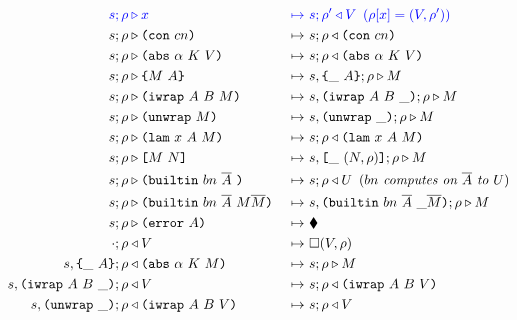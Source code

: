 \documentclass[../plutus-core-specification.tex]{subfiles}
\begin{document}
\begin{figure}[!ht]
  \ContinuedFloat
\begin{subfigure}[c]{\linewidth}  %
    \begin{alignat*}{2}
      \blue{s; \rho} & \bcompute \blue{x}          &~\bmapsto~&\blue{s;\rho^{\prime} \return V \enspace (\rho[x] = (V,\rho^{\prime}))} \\
       s; \rho &\compute \con{cn}                 &~\mapsto~& s;\rho \return \con{cn}\\
       s; \rho &\compute \abs{\alpha}{K}{V}       &~\mapsto~& s;\rho \return \abs{\alpha}{K}{V}\\
       s; \rho &\compute \inst{M}{A}              &~\mapsto~& s,\inInstLeftFrame{A};\rho \compute M\\
       s; \rho &\compute \wrap{A}{B}{M}           &~\mapsto~& s,\inWrapRightFrame{A}{B};\rho  \compute M\\ 
       s; \rho &\compute \unwrap{M}               &~\mapsto~& s,\inUnwrapFrame{};\rho  \compute M\\
       s; \rho &\compute \lam{x}{A}{M}            &~\mapsto~& s;\rho \return \lam{x}{A}{M}\\
       s; \rho &\compute \app{M}{N}               &~\mapsto~& s,\inAppLeftFrame{(N,\rho)};\rho \compute M\\
       s; \rho &\compute \builtin{bn}{\repetition{A}}{} &~\mapsto~& s;\rho \return U \enspace (\textit{$bn$ computes on $\repetition{A}$ to $U$})\\
       s; \rho &\compute \builtin{bn}{\repetition{A}}{M \repetition{M}} &~\mapsto~& s,\inBuiltin{bn}{\repetition{A}}{}{\_}{\repetition{M}};\rho \compute M\\
       s; \rho &\compute \error{A}                &~\mapsto~& \ckerror{}\\
       \cdot; \rho &\return V                     &~\mapsto~& \square (V, \rho)\\
       s,\inInstLeftFrame{A}; \rho                &\return \abs{\alpha}{K}{M} &~\mapsto~& s;\rho \compute{M} \\
       s,\inWrapRightFrame{A}{B}; \rho            &\return V &~\mapsto~& s;\rho \return \wrap{A}{B}{V}\\
       s,\inUnwrapFrame{}; \rho                   &\return \wrap{A}{B}{V} &~\mapsto~& s;\rho \return V\\

\end{alignat*}
\end{subfigure}
\end{figure}
\end{document}
